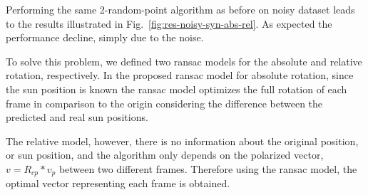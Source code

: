 Performing the same 2-random-point algorithm as before on noisy dataset leads
to the results illustrated in Fig.~\ref{fig:res-noisy-syn-abs-rel}. As expected the
performance decline, simply due to the noise.

To solve this problem, we defined two ransac models for the absolute and
relative rotation, respectively.  In the proposed ransac model for absolute
rotation, since the sun position is known the ransac model optimizes the full
rotation of each frame in comparison to the origin considering the difference
between the predicted and real sun positions.

The relative model, however, there is no information about the original
position, or sun position, and the algorithm only depends on the polarized
vector, $v = R_{cp}*v_p$ between two different frames. Therefore using the ransac
model, the optimal vector representing each frame is obtained.

